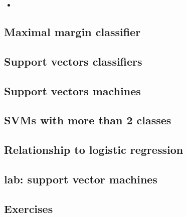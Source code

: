 \begin{itemize}
	\item
 \end{itemize}
\subsection{Maximal margin classifier}

\subsection{Support vectors classifiers}

\subsection{Support vectors machines}

\subsection{SVMs with more than 2 classes}

\subsection{Relationship to logistic regression}

\subsection{lab: support vector machines}

\subsection{Exercises}

